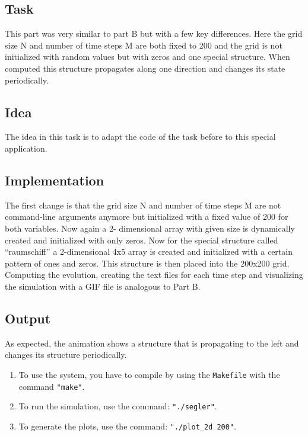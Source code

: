 \documentclass[12pt,a4paper]{article}
\begin{document}
\subsection{Task}
This part was very similar to part B but with a few key differences. Here the grid size N and
number of time steps M are both fixed to 200 and the grid is not initialized with random values
but with zeros and one special structure. When computed this structure propagates along one
direction and changes its state periodically.


\vspace{1cm}

\subsection{Idea}
The idea in this task is to adapt the code of the task before to this special application.


\vspace{1cm}

\subsection{Implementation}
The first change is that the grid size N and number of time steps M are not command-line
arguments anymore but initialized with a fixed value of 200 for both variables. Now again a 2-
dimensional array with given size is dynamically created and initialized with only zeros. Now for
the special structure called “raumschiff” a 2-dimensional 4x5 array is created and initialized
with a certain pattern of ones and zeros. This structure is then placed into the 200x200 grid.
Computing the evolution, creating the text files for each time step and visualizing the simulation
with a GIF file is analogous to Part B.


\newpage

\subsection{Output}
As expected, the animation shows a structure that is propagating to the left and changes its
structure periodically.

\vspace{0.1cm}

\begin{enumerate}[label=\roman*.]
    \item 
    To use the system, you have to compile by using the \texttt{Makefile} with the command \texttt{"make"}.
    \newline
    \vspace{0.1 cm}

    \item 
    To run the simulation, use the command: \texttt{"./segler"}.
    \newline
    \vspace{0.1 cm}

    \item 
    To generate the plots, use the command: \texttt{"./plot\_2d 200"}.
\end{enumerate}
\end{document}
